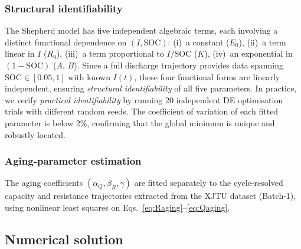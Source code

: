 \documentclass[5p,times,number]{elsarticle}
\newcommand{\eqnsref}[2]{\textcolor{supercolor}{Eqs.~\eqref{#1}--\eqref{#2}}}
\begin{document}
\subsubsection{Structural identifiability}
The Shepherd model has five independent algebraic terms, each involving a distinct functional dependence on $(I, \mathrm{SOC})$:
(i)~a constant ($E_0$),
(ii)~a term linear in $I$ ($R_0$),
(iii)~a term proportional to $I/\mathrm{SOC}$ ($K$),
(iv)~an exponential in $(1-\mathrm{SOC})$ ($A$, $B$).
Since a full discharge trajectory provides data spanning $\mathrm{SOC} \in [0.05, 1]$ with known $I(t)$, these four functional forms are linearly independent, ensuring \emph{structural identifiability} of all five parameters.
In practice, we verify \emph{practical identifiability} by running 20 independent DE optimisation trials with different random seeds.  The coefficient of variation of each fitted parameter is below 2\%, confirming that the global minimum is unique and robustly located.

\subsubsection{Aging-parameter estimation}
The aging coefficients $(\alpha_Q, \beta_R, \gamma)$ are fitted separately to the cycle-resolved capacity and resistance trajectories extracted from the XJTU dataset (Batch-1), using nonlinear least squares on \eqnsref{eq:Raging}{eq:Qaging}.

\subsection{Numerical solution}\label{sec:numerics}
\end{document}
